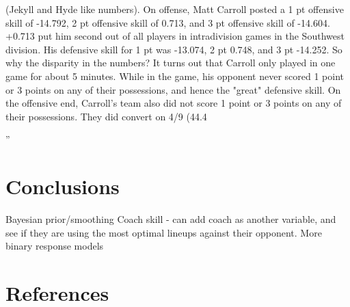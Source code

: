 \documentclass[10pt,twocolumn]{article}
\begin{document}
(Jekyll and Hyde like numbers).
On offense, Matt Carroll posted a 1 pt offensive skill of -14.792, 2 pt offensive skill of 0.713, and 3 pt offensive skill of -14.604. +0.713 put him second out of all players in intradivision games in the Southwest division. His defensive skill for 1 pt was -13.074, 2 pt 0.748, and 3 pt -14.252. So why the disparity in the numbers? It turns out that Carroll only played in one game for about 5 minutes. While in the game, his opponent never scored 1 point or 3 points on any of their possessions, and hence the "great" defensive skill. On the offensive end, Carroll's team also did not score 1 point or 3 points on any of their possessions. They did convert on 4/9 (44.4%

''

\section{Conclusions}

Bayesian prior/smoothing
Coach skill - can add coach as another variable, and see if they are using the most optimal lineups against their opponent.
More binary response models

\section{References}


%
\end{document}
